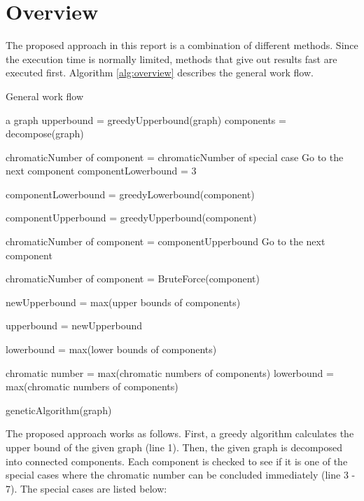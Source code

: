 \documentclass[a4paper]{report}
\begin{document}
	\section{Overview}
	The proposed approach in this report is a combination of different methods. Since the execution time is normally limited, methods that give out results fast are executed first. Algorithm \ref{alg:overview} describes the general work flow.\\
	\begin{algorithm}
		\caption{General work flow}
		\label{alg:overview}
		\begin{algorithmic}[1]
			\REQUIRE a graph
			\STATE upperbound = greedyUpperbound(graph)
			\STATE components = decompose(graph)
				
					\STATE chromaticNumber of component = chromaticNumber of special case
					\STATE Go to the next component
				\ELSE 
					\STATE componentLowerbound = 3
				\ENDIF
				
				\STATE componentLowerbound = greedyLowerbound(component)
				\ENDIF
				
				\STATE componentUpperbound =  greedyUpperbound(component)

				\STATE chromaticNumber of component = componentUpperbound
				\STATE Go to the next component
				\ENDIF
				
				\STATE chromaticNumber of component = BruteForce(component)
				\ENDIF 
			\ENDFOR

			\STATE newUpperbound = max(upper bounds of components)
			
			\STATE upperbound = newUpperbound 
			\ENDIF
			
			\STATE lowerbound = max(lower bounds of components)
			
			\STATE chromatic number = max(chromatic numbers of components)
			\ELSE
			\STATE lowerbound = max(chromatic numbers of components)
			\ENDIF
			
			\STATE geneticAlgorithm(graph)
		\end{algorithmic}
	\end{algorithm}
	The proposed approach works as follows. First, a greedy algorithm calculates the upper bound of the given graph (line 1). Then, the given graph is decomposed into connected components. Each component is checked to see if it is one of the special cases where the chromatic number can be concluded immediately (line 3 - 7). The special cases are listed below: 
\end{document}
